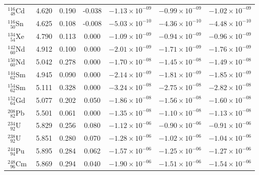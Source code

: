 \begin{table}
\begin{minipage}{\textwidth}
\begin{tabular}{lcccccc}
$^{116}_{\phantom{0}48}$Cd$\;$\footnotemark[1]           & 4.620 & 0.190                 & -0.038        & $-1.13\times 10^{-09}$ & $-0.99\times 10^{-09}$ & $-1.02\times 10^{-09}$ \\[4pt]
$^{116}_{\phantom{0}50}$Sn$\;$\footnotemark[1]           & 4.625 & 0.108                 & -0.008        & $-5.03\times 10^{-10}$ & $-4.36\times 10^{-10}$ & $-4.48\times 10^{-10}$ \\[4pt]
$^{134}_{\phantom{0}54}$Xe$\;$\footnotemark[1]           & 4.790 & 0.113                 & 0.000         & $-1.09\times 10^{-09}$ & $-0.94\times 10^{-09}$ & $-0.96\times 10^{-09}$ \\[4pt]
$^{142}_{\phantom{0}60}$Nd$\;$\footnotemark[2]           & 4.912 & 0.100                 & 0.000         & $-2.01\times 10^{-09}$ & $-1.71\times 10^{-09}$ & $-1.76\times 10^{-09}$ \\[4pt]
$^{150}_{\phantom{0}60}$Nd$\;$\footnotemark[2]           & 5.042 & 0.278                 & 0.000         & $-1.70\times 10^{-08}$ & $-1.45\times 10^{-08}$ & $-1.49\times 10^{-08}$ \\[4pt]
$^{144}_{\phantom{0}62}$Sm$\;$\footnotemark[2]           & 4.945 & 0.090                 & 0.000         & $-2.14\times 10^{-09}$ & $-1.81\times 10^{-09}$ & $-1.85\times 10^{-09}$ \\[4pt]
$^{154}_{\phantom{0}62}$Sm$\;$\footnotemark[2]           & 5.111 & 0.328                 & 0.000         & $-3.24\times 10^{-08}$ & $-2.75\times 10^{-08}$ & $-2.82\times 10^{-08}$ \\[4pt]
$^{152}_{\phantom{0}64}$Gd$\;$\footnotemark[1]           & 5.077 & 0.202                 & 0.050         & $-1.86\times 10^{-08}$ & $-1.56\times 10^{-08}$ & $-1.60\times 10^{-08}$ \\[4pt]
$^{208}_{\phantom{0}82}$Pb$\;$\footnotemark[1]           & 5.501 & 0.061                 & 0.000         & $-1.35\times 10^{-08}$ & $-1.10\times 10^{-08}$ & $-1.13\times 10^{-08}$ \\[4pt]
$^{234}_{\phantom{0}92}$U$\;$\footnotemark[2]            & 5.829 & 0.256                 & 0.080         & $-1.12\times 10^{-06}$ & $-0.90\times 10^{-06}$ & $-0.91\times 10^{-06}$ \\[4pt]
$^{238}_{\phantom{0}92}$U$\;$\footnotemark[2]            & 5.851 & 0.280                 & 0.070         & $-1.28\times 10^{-06}$ & $-1.02\times 10^{-06}$ & $-1.04\times 10^{-06}$ \\[4pt]
$^{244}_{\phantom{0}94}$Pu$\;$\footnotemark[1]           & 5.895 & 0.284                 & 0.062         & $-1.57\times 10^{-06}$ & $-1.25\times 10^{-06}$ & $-1.27\times 10^{-06}$ \\[4pt]
$^{248}_{\phantom{0}96}$Cm$\;$\footnotemark[1]           & 5.869 & 0.294                 & 0.040         & $-1.90\times 10^{-06}$ & $-1.51\times 10^{-06}$ & $-1.54\times 10^{-06}$
\end{tabular}
\end{minipage}
\end{table}
\clearpage
